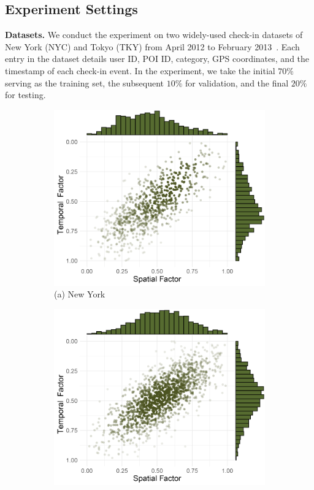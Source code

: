 \documentclass[letterpaper]{article} %
\begin{document}
\subsection{Experiment Settings}
\noindent \textbf{Datasets.} 
We conduct the experiment on two widely-used check-in datasets of New York (NYC) and Tokyo (TKY) from April 2012 to February 2013~\cite{yang2014modeling}.
Each entry in the dataset details user ID, POI ID, category, GPS coordinates, and the timestamp of each check-in event. 
In the experiment, we take the initial $70\%$ serving as the training set, the subsequent $10\%$ for validation, and the final $20\%$ for testing. 

\begin{figure}[!th]
\centering
\begin{subfigure}{.24\textwidth}
  \centering
  \includegraphics[width=\linewidth]{4_nyc.pdf}
  \scriptsize (a) New York
\end{subfigure}%
\begin{subfigure}{.24\textwidth}
  \centering
  \includegraphics[width=\linewidth]{4_tky.pdf}

\end{subfigure}
\end{figure}
\end{document}
